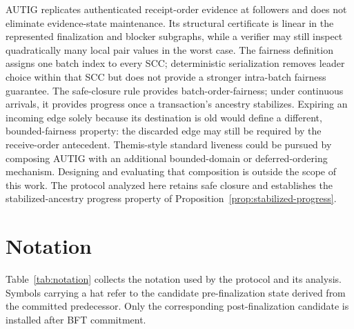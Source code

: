 AUTIG replicates authenticated receipt-order evidence at followers and does
not eliminate evidence-state maintenance.  Its structural certificate is
linear in the represented finalization and blocker subgraphs, while a verifier
may still inspect quadratically many local pair values in the worst case.  The
fairness definition assigns one batch index to every SCC; deterministic
serialization removes leader choice within that SCC but does not provide a
stronger intra-batch fairness guarantee.  The safe-closure rule provides
batch-order-fairness; under continuous arrivals, it provides progress once a
transaction's ancestry stabilizes.  Expiring an incoming edge solely because
its destination is old would define a different, bounded-fairness property: the
discarded edge may still be required by the receive-order antecedent.
Themis-style standard liveness could be pursued by composing AUTIG with an
additional bounded-domain or deferred-ordering mechanism.  Designing and
evaluating that composition is outside the scope of this work.  The protocol
analyzed here retains safe closure and establishes the stabilized-ancestry
progress property of Proposition~\ref{prop:stabilized-progress}.

\appendices
\section{Notation}
\label{app:notation}

Table~\ref{tab:notation} collects the notation used by the protocol and its
analysis.  Symbols carrying a hat refer to the candidate pre-finalization
state derived from the committed predecessor.  Only the corresponding
post-finalization candidate is installed after BFT commitment.

